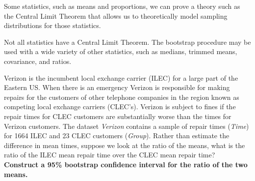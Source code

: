 \pagestyle{fancy}
\renewcommand{\theUnit}{5}
\ifthenelse{\isundefined{\UnitPageNumbers}}{}{\setcounter{page}{1}}
\rhead{Chapter \theUnit: Bootstrap Distributions}
\rfoot{\mypage}
\renewcommand{\footrulewidth}{.4pt}
\vspace*{-20pt} \thispagestyle{firstfooter}





\bbox
Some statistics, such as means and proportions, we can prove a theory such as the Central Limit Theorem that allows us to theoretically model sampling distributions for those statistics.

\bi
\ii Not all statistics have a Central Limit Theorem.
\ii The bootstrap procedure may be used with a wide variety of other statistics, such as medians, trimmed means, covariance, and ratios.
\ii \textbf{}
\ei
\ebox

\bb
\ii Verizon is the incumbent local exchange carrier (ILEC) for a large part of the Eastern US. When there is an emergency Verizon is responsible for making repairs for the customers of other telephone companies in the region known as competing local exchange carriers (CLEC's). Verizon is subject to fines if the repair times for CLEC customers are substantially worse than the times for Verizon customers. The dataset \textit{Verizon} contains a sample of repair times (\textit{Time}) for 1664 ILEC and 23 CLEC customers (\textit{Group}). Rather than estimate the difference in mean times, suppose we look at the ratio of the means, what is the ratio of the ILEC mean repair time over the CLEC mean repair time?  \textbf{Construct a 95\% bootstrap confidence interval for the ratio of the two means.} \label{verizon-ratio}\bigskip

